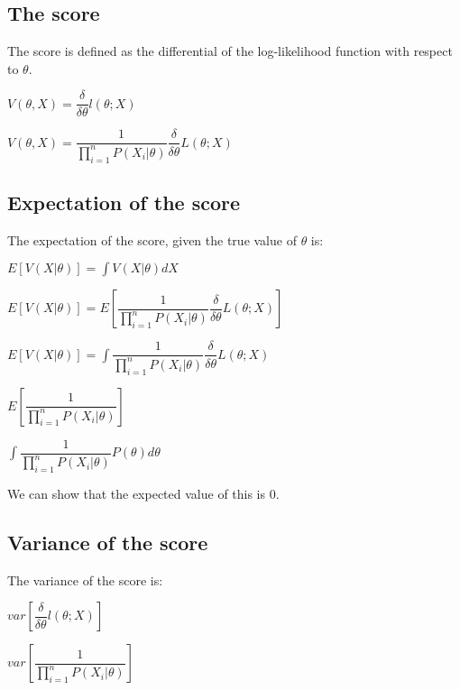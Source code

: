 
\subsection{The score}

The score is defined as the differential of the log-likelihood function with respect to \(\theta \).

\(V(\theta, X)=\dfrac{\delta }{\delta \theta }l(\theta ; X) \)

\(V(\theta, X)=\dfrac{1 }{\prod_{i=1}^nP(X_i|\theta )}\dfrac{\delta }{\delta \theta}L(\theta; X) \)

\subsection{Expectation of the score}

The expectation of the score, given the true value of \(\theta \) is:

\(E[V(X|\theta)]=\int V(X|\theta) dX\)

\(E[V(X|\theta)]=E[\dfrac{1 }{\prod_{i=1}^nP(X_i|\theta )}\dfrac{\delta }{\delta \theta}L(\theta; X) ]\)

\(E[V(X|\theta)]=\int \dfrac{1 }{\prod_{i=1}^nP(X_i|\theta )}\dfrac{\delta }{\delta \theta}L(\theta; X) \)

\(E[\dfrac{1 }{\prod_{i=1}^nP(X_i|\theta )}]\)

\(\int \dfrac{1 }{\prod_{i=1}^nP(X_i|\theta )}P(\theta )d\theta \)

We can show that the expected value of this is \(0\).

\subsection{Variance of the score}

The variance of the score is:

\(var [\dfrac{\delta }{\delta \theta }l(\theta ; X) ]\)

\(var [\dfrac{1 }{\prod_{i=1}^nP(X_i|\theta )}]\)


